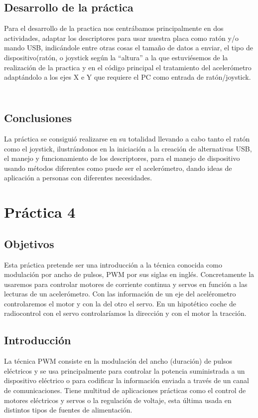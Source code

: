 \documentclass[a4paper, 11pt]{article}
\begin{document}
\subsection{Desarrollo de la práctica}

Para el desarrollo de la practica nos centrábamos principalmente en dos
actividades, adaptar los descriptores para usar nuestra placa como ratón y/o
mando USB, indicándole entre otras cosas el tamaño de datos a enviar, el tipo
de dispositivo(ratón, o joystick según la ``altura'' a la que estuviésemos de
la realización de la practica y en el código principal el tratamiento del
acelerómetro adaptándolo a los ejes X e Y que requiere el PC como entrada de
ratón/joystick.

\inputminted[tabsize=4, fontsize=\small]{c}{prac3-desc.c}
\inputminted[tabsize=4, fontsize=\small]{c}{prac3-main.c}
\subsection{Conclusiones}

La práctica se consiguió realizarse en su totalidad llevando a cabo tanto el
ratón como el joystick, ilustrándonos en la iniciación a la creación de
alternativas USB, el manejo y funcionamiento de los descriptores, para el
manejo de dispositivo usando métodos diferentes como puede ser el acelerómetro,
dando ideas de aplicación a personas con diferentes necesidades.

\section{Práctica 4}

\subsection{Objetivos}
Esta práctica pretende ser una introducción a la técnica conocida
como modulación por ancho de pulsos, PWM por sus siglas en inglés.
Concretamente la usaremos para controlar motores de corriente
continua y servos en función a las lecturas de un acelerómetro. Con
las información de un eje del acelérometro controlaremos el motor y
con la del otro el servo. En un hipotético coche de radiocontrol
con el servo controlaríamos la dirección y con el motor la
tracción.

\subsection{Introducción}
La técnica PWM consiste en la modulación del ancho (duración) de
pulsos eléctricos y se usa principalmente para controlar la
potencia suministrada a un dispositivo eléctrico o para codificar
la información enviada a través de un canal de comunicaciones.
Tiene multitud de aplicaciones prácticas como el control de motores
eléctricos y servos o la regulación de voltaje, esta última usada
en distintos tipos de fuentes de alimentación.
\end{document}

